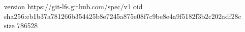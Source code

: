 version https://git-lfs.github.com/spec/v1
oid sha256:eb1b37a781266b354425b8e7245a875e08f7c9be8e4a9f5182f3b2c202adf28c
size 786528
